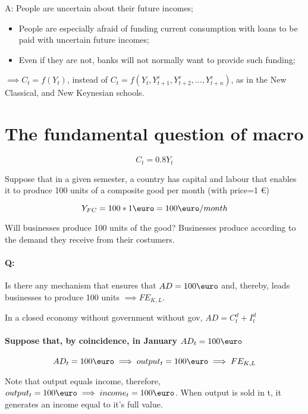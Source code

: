 \documentclass{report}
\begin{document}
A: People are uncertain about their future incomes;

\begin{itemize}
    \item People are especially afraid of funding current consumption with loans to be paid with uncertain future incomes; 
    \item Even if they are not, banks will not normally want to provide such funding;
\end{itemize}

$\implies C_t=f(Y_t)$, instead of $C_t=f(Y_t, Y_{t+1}^e, Y_{t+2}^e, ... ,Y_{t+n}^e)$, as in the New Classical, and New Keynesian schools. 

\section{The fundamental question of macro}

\begin{equation*}
    C_t=0.8Y_t
\end{equation*}

Suppose that in a given semester, a country has capital and labour that enables it to produce 100 units of a composite good per month (with price=1 \euro)

\begin{equation*}
    Y_{FC}=100*1\text{\euro}=100\text{\euro} /month
\end{equation*}

Will businesses produce 100 units of the good? Businesses produce according to the demand they receive from their costumers. 

\paragraph{Q:} Is there any mechanism that ensures that $AD=100\text{\euro}$ and, thereby, leads businesses to produce 100 units $\implies FE_{K,L}$.

In a closed economy without government without gov, $AD=C_t^d+I_t^d$

\paragraph{Suppose that, by coincidence, in January $AD_t=100\text{\euro}$}

$$
    AD_t=100 \text{\euro} \implies output_t=100\text{\euro} \implies FE_{K,L}
$$

Note that output equals income, therefore, $output_t=100 \text{\euro} \implies income_t=100\text{\euro} $. When output is sold in t, it generates an income equal to it's full value. 
\end{document}
